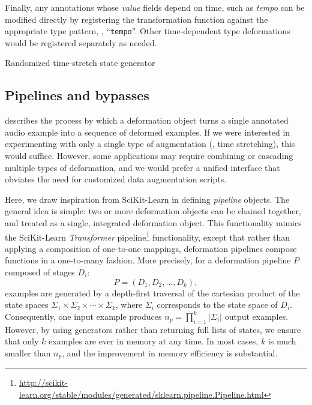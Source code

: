 \documentclass{article}
\begin{document}
Finally, any annotations whose \emph{value} fields depend on time, such as \emph{tempo}
can be modified directly by registering the transformation function against the
appropriate type pattern, \eg, ``\texttt{tempo}''.  Other time-dependent type
deformations would be registered separately as needed.

\begin{algorithm}[t]
    \caption{Randomized time-stretch state generator\label{alg:timestate}}
    \begin{algorithmic}[1]
            \EndFor{}
        \EndFunction{}
    \end{algorithmic}
\end{algorithm}

\subsection{Pipelines and bypasses}
 describes the process by which a deformation object turns a
single annotated audio example into a sequence of deformed examples.  If we were
interested in experimenting with only a single type of augmentation (\eg, time stretching),
this would suffice.  However, some applications may require combining or cascading
multiple types of deformation, and we would prefer a unified interface that obviates the
need for customized data augmentation scripts.

Here, we draw inspiration from SciKit-Learn in defining \emph{pipeline}
objects.  The general idea is simple: two or more deformation objects can be chained
together, and treated as a single, integrated deformation object.  This functionality
mimics the SciKit-Learn \emph{Transformer} pipeline\footnote{\url{http://scikit-learn.org/stable/modules/generated/sklearn.pipeline.Pipeline.html}} functionality, except that rather
than applying a composition of one-to-one mappings, deformation pipelines
compose functions in a one-to-many fashion.  More precisely, for a deformation pipeline
$P$ composed of stages $D_i$:
\[
P = (D_1, D_2, \dots, D_k),
\]examples are generated by a depth-first traversal of the
cartesian product of the state spaces
${\Sigma_1 \times \Sigma_2 \times \cdots \times \Sigma_k}$, where $\Sigma_i$ corresponds
to the state space of $D_i$.  Consequently, one input example produces $n_p = \prod_{i=1}^k
|\Sigma_i|$ output examples.  However, by using generators rather than returning full
lists of states, we ensure that only $k$ examples are ever in memory at any time.
In most cases, $k$ is much smaller than $n_p$, and the improvement in memory efficiency
is substantial.
\end{document}
